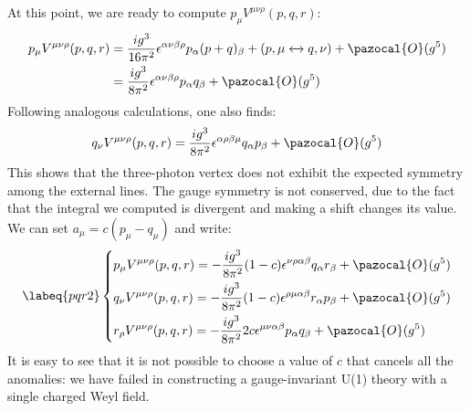\documentclass[../main.tex]{subfiles}
\begin{document}
At this point, we are ready to compute $p_\mu V^{\mu\nu\rho}(p,q,r)$:
\begin{align*}
p_\mu V^{\mu\nu\rho}(p,q,r)&=\frac{ig^3}{16\pi^2}\epsilon^{\alpha\nu\beta\rho}p_\alpha(p+q)_\beta+(p,\mu\xleftrightarrow[]{}q,\nu)+\pazocal{O}(g^5)\\
&=\frac{ig^3}{8\pi^2}\epsilon^{\alpha\nu\beta\rho}p_\alpha q_\beta+\pazocal{O}(g^5)
\end{align*}
Following analogous calculations, one also finds:
\[
q_\nu V^{\mu\nu\rho}(p,q,r)=\frac{ig^3}{8\pi^2}\epsilon^{\alpha\rho\beta\mu}q_\alpha p_\beta+\pazocal{O}(g^5)
\]
This shows that the three-photon vertex does not exhibit the expected symmetry among the external lines. The gauge symmetry is not conserved, due to the fact that the integral we computed is divergent and making a shift changes its value. We can set $a_\mu=c(p_\mu-q_\mu)$ and write:
\begin{equation}
\labeq{pqr2}
\left\{
\begin{aligned}
&p_\mu V^{\mu\nu\rho}(p,q,r)=-\frac{ig^3}{8\pi^2}(1-c)\epsilon^{\nu\rho\alpha\beta}q_\alpha r_\beta+\pazocal{O}(g^5)\\
&q_\nu V^{\mu\nu\rho}(p,q,r)=-\frac{ig^3}{8\pi^2}(1-c)\epsilon^{\rho\mu\alpha\beta}r_\alpha p_\beta+\pazocal{O}(g^5)\\
&r_\rho V^{\mu\nu\rho}(p,q,r)=-\frac{ig^3}{8\pi^2}2c\epsilon^{\mu\nu\alpha\beta}p_\alpha q_\beta+\pazocal{O}(g^5)
\end{aligned}
\right.
\end{equation}
It is easy to see that it is not possible to choose a value of $c$ that cancels all the anomalies: we have failed in constructing a gauge-invariant U(1) theory with a single charged Weyl field.
\end{document}
